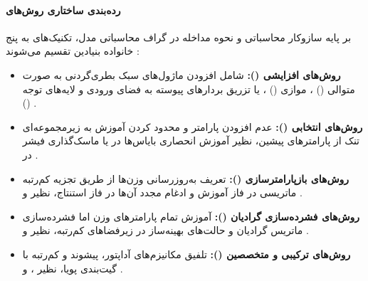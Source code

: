 \paragraph*{رده‌بندی ساختاری روش‌های }
بر پایه سازوکار محاسباتی و نحوه مداخله در گراف محاسباتی مدل، تکنیک‌های  به پنج خانواده بنیادین تقسیم می‌شوند \cite{han2024peft, zhang2025survey, prottasha2025pefta2z}:
\begin{itemize}
    \item \textbf{روش‌های افزایشی ():} شامل افزودن ماژول‌های سبک بطری‌گردنی به صورت متوالی () \cite{houlsby2019parameter}، موازی () \cite{he2021towards}، یا تزریق بردارهای پیوسته به فضای ورودی و لایه‌های توجه () \cite{li2021prefix, lester2021power}.
    \item \textbf{روش‌های انتخابی ():} عدم افزودن پارامتر و محدود کردن آموزش به زیرمجموعه‌ای تنک از پارامترهای پیشین، نظیر آموزش انحصاری بایاس‌ها در  \cite{ben-zaken-etal-2022-bitfit} یا ماسک‌گذاری فیشر در  \cite{sung2021training}.
    \item \textbf{روش‌های بازپارامترسازی ():} تعریف به‌روزرسانی وزن‌ها از طریق تجزیه کم‌رتبه ماتریسی در فاز آموزش و ادغام مجدد آن‌ها در فاز استنتاج، نظیر  \cite{hu2022lora} و  \cite{liu2024dora}.
    \item \textbf{روش‌های فشرده‌سازی گرادیان ():} آموزش تمام پارامترهای وزن اما فشرده‌سازی ماتریس گرادیان و حالت‌های بهینه‌ساز در زیرفضاهای کم‌رتبه، نظیر  \cite{zhao2024galore} و  \cite{liu2025optimization}.
    \item \textbf{روش‌های ترکیبی و متخصصین ():} تلفیق مکانیزم‌های آداپتور، پیشوند و کم‌رتبه با گیت‌بندی پویا، نظیر  \cite{mao2021unipelt}،  \cite{he2021towards} و  \cite{liu2023moelora}.
\end{itemize}

